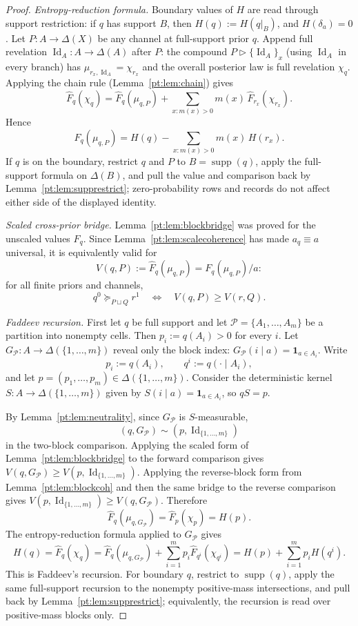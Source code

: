 \documentclass[11pt,a4paper]{article}
\theoremstyle{definition}
\newcommand{\Id}{\operatorname{Id}}
\newcommand{\1}{\mathbf 1}
\begin{document}
\begin{proof}
\emph{Entropy-reduction formula.}  Boundary values of $H$ are read through support restriction: if $q$ has support
$B$, then $H(q):=H(q|_B)$, and $H(\delta_a)=0$.  Let $P:A\to\Delta(X)$ be any channel at full-support prior $q$.  Append
full revelation $\Id_A:A\to\Delta(A)$ after $P$: the compound $P\triangleright\{\Id_A\}_x$ (using $\Id_A$ in every branch)
has $\mu_{r_x,\Id_A}=\chi_{r_x}$ and the overall posterior law is full revelation $\chi_q$.  Applying the chain rule
(Lemma~\ref{pt:lem:chain}) gives
\[
\widehat F_q(\chi_q)
=
\widehat F_q(\mu_{q,P})+\sum_{x:m(x)>0}m(x)\,\widehat F_{r_x}(\chi_{r_x}).
\]
Hence
\[
\widehat F_q(\mu_{q,P})=H(q)-\sum_{x:m(x)>0}m(x)\,H(r_x).
\]
If $q$ is on the boundary, restrict $q$ and $P$ to $B=\operatorname{supp}(q)$, apply the full-support formula on
$\Delta(B)$, and pull the value and comparison back by Lemma~\ref{pt:lem:supprestrict}; zero-probability rows and records
do not affect either side of the displayed identity.

\emph{Scaled cross-prior bridge.}
Lemma~\ref{pt:lem:blockbridge} was proved for the unscaled values $F_q$.  Since Lemma~\ref{pt:lem:scalecoherence} has made
$a_q\equiv a$ universal, it is equivalently valid for
\[
V(q,P):=\widehat F_q(\mu_{q,P})=F_q(\mu_{q,P})/a:
\]
for all finite priors and channels,
\[
q^0\succeq_{P\sqcup Q}r^1
\quad\Longleftrightarrow\quad
V(q,P)\ge V(r,Q).
\]

\emph{Faddeev recursion.}  First let $q$ be full support and let $\mathcal P=\{A_1,\dots,A_m\}$ be a partition into
nonempty cells.  Then $p_i:=q(A_i)>0$ for every $i$.  Let $G_{\mathcal P}:A\to\Delta(\{1,\dots,m\})$ reveal only the
block index: $G_{\mathcal P}(i\mid a)=\1_{a\in A_i}$.  Write
\[
p_i:=q(A_i),\qquad q^i:=q(\cdot\mid A_i),
\]
and let $p=(p_1,\dots,p_m)\in\Delta(\{1,\dots,m\})$.  Consider the deterministic kernel
$S:A\to\Delta(\{1,\dots,m\})$ given by
$S(i\mid a)=\1_{a\in A_i}$, so $qS=p$.

By Lemma~\ref{pt:lem:neutrality}, since $G_{\mathcal P}$ is $S$-measurable,
\[
(q,G_{\mathcal P})\sim(p,\Id_{\{1,\dots,m\}})
\]
in the two-block comparison.  Applying the scaled form of Lemma~\ref{pt:lem:blockbridge} to the forward comparison gives
$V(q,G_{\mathcal P})\ge V(p,\Id_{\{1,\dots,m\}})$.  Applying the reverse-block form from Lemma~\ref{pt:lem:blockcoh} and then
the same bridge to the reverse comparison gives $V(p,\Id_{\{1,\dots,m\}})\ge V(q,G_{\mathcal P})$.  Therefore
\[
\widehat F_q(\mu_{q,G_{\mathcal P}})
=\widehat F_p(\chi_p)=H(p).
\]
The entropy-reduction formula applied to $G_{\mathcal P}$ gives
\[
H(q)=\widehat F_q(\chi_q)
=\widehat F_q(\mu_{q,G_{\mathcal P}})+\sum_{i=1}^m p_i\widehat F_{q^i}(\chi_{q^i})
=H(p)+\sum_{i=1}^m p_iH(q^i).
\]
This is Faddeev's recursion.  For boundary $q$, restrict to $\operatorname{supp}(q)$, apply the same full-support recursion
to the nonempty positive-mass intersections, and pull back by Lemma~\ref{pt:lem:supprestrict}; equivalently, the recursion is
read over positive-mass blocks only.


\end{proof}
\end{document}
